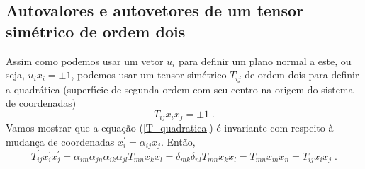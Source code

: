 \subsection{Autovalores e autovetores de um tensor sim\'etrico de
ordem dois}

Assim como podemos usar um vetor $u_i$ para definir um plano
normal a este, ou seja, $u_i x_i = \pm 1$, podemos usar um tensor
sim\'etrico $T_{ij}$ de ordem dois para definir a quadr\'atica
(superf\'{\i}cie de segunda ordem com seu centro na origem do
sistema de coordenadas)
\begin{equation}
   T_{ij}x_i x_j = \pm 1 \;.
   \label{T_quadratica}
\end{equation}
Vamos mostrar que a equa\c{c}\~ao (\ref{T_quadratica}) \'e
invariante com respeito \`a mudan\c{c}a de coordenadas
$x_i^{'}=\alpha_{ij}x_j$. Ent\~ao,
\begin{equation}
   T_{ij}^{'} x_i^{'} x_j^{'} = \alpha_{im}\alpha_{jn}\alpha_{ik}\alpha_{jl} T_{mn} x_k x_l = \delta_{mk} \delta_{nl} T_{mn} x_k x_l = T_{mn} x_m x_n = T_{ij} x_i x_j \;.
   \label{T_q_invariante}
\end{equation}


